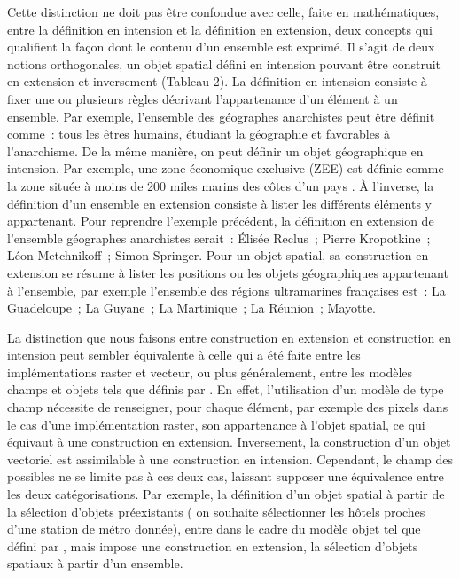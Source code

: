 Cette distinction ne doit pas être confondue avec celle, faite en
mathématiques, entre la définition en intension et la définition en
extension, deux concepts qui qualifient la façon dont le contenu d’un
ensemble est exprimé. Il s’agit de deux notions orthogonales, un objet
spatial défini en intension pouvant être construit en extension et
inversement (Tableau 2). La définition en intension consiste à fixer
une ou plusieurs règles décrivant l’appartenance d’un élément à un
ensemble. Par exemple, l’ensemble des géographes anarchistes peut être
définit comme : tous les êtres humains, étudiant la géographie et
favorables à l’anarchisme. De la même manière, on peut définir un
objet géographique en intension. Par exemple, une zone économique
exclusive (ZEE) est définie comme la zone située à moins de 200 miles
marins des côtes d’un pays \autocite{Brunet1992}. À l’inverse, la
définition d’un ensemble en extension consiste à lister les différents
éléments y appartenant. Pour reprendre l’exemple précédent, la
définition en extension de l’ensemble géographes anarchistes serait :
Élisée Reclus ; Pierre Kropotkine ; Léon Metchnikoff ; Simon
Springer. Pour un objet spatial, sa construction en extension se
résume à lister les positions ou les objets géographiques appartenant
à l’ensemble, par exemple l’ensemble des régions ultramarines
françaises est : La Guadeloupe ; La Guyane ; La Martinique ; La
Réunion ; Mayotte.

La distinction que nous faisons entre construction en extension et
construction en intension peut sembler équivalente à celle qui a été
faite entre les implémentations raster et vecteur, ou plus
généralement, entre les modèles champs et objets tels que définis par
\textcite{Couclelis1992,Goodchild1992}. En effet, l’utilisation d’un
modèle de type champ nécessite de renseigner, pour chaque élément, par
exemple des pixels dans le cas d’une implémentation raster, son
appartenance à l’objet spatial, ce qui équivaut à une construction en
extension. Inversement, la construction d’un objet vectoriel est
assimilable à une construction en intension. Cependant, le champ des
possibles ne se limite pas à ces deux cas, laissant supposer une
équivalence entre les deux catégorisations. Par exemple, la définition
d’un objet spatial à partir de la sélection d’objets préexistants (\eg
on souhaite sélectionner les hôtels proches d’une station de métro
donnée), entre dans le cadre du modèle objet tel que défini par
\textcite{Couclelis1992}, mais impose une construction en extension,
\ie la sélection d’objets spatiaux à partir d’un ensemble.

